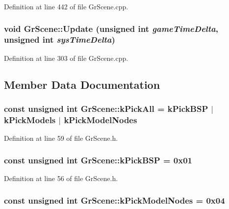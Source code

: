 Definition at line 442 of file GrScene.cpp.\hypertarget{class_gr_scene_c54d822c42d667aff5aea61a64553402}{
\subsubsection[{Update}]{\setlength{\rightskip}{0pt plus 5cm}void GrScene::Update (unsigned int {\em gameTimeDelta}, \/  unsigned int {\em sysTimeDelta})}}
\label{class_gr_scene_c54d822c42d667aff5aea61a64553402}




Definition at line 303 of file GrScene.cpp.

\subsection{Member Data Documentation}
\hypertarget{class_gr_scene_a8cf807b21fc873fd6158af7ca6da3e5}{
\subsubsection[{kPickAll}]{\setlength{\rightskip}{0pt plus 5cm}const unsigned int {\bf GrScene::kPickAll} = {\bf kPickBSP} $|$ {\bf kPickModels} $|$ {\bf kPickModelNodes}}}
\label{class_gr_scene_a8cf807b21fc873fd6158af7ca6da3e5}




Definition at line 59 of file GrScene.h.\hypertarget{class_gr_scene_a2d4949176b03e4de401133af3c7539c}{
\subsubsection[{kPickBSP}]{\setlength{\rightskip}{0pt plus 5cm}const unsigned int {\bf GrScene::kPickBSP} = 0x01}}
\label{class_gr_scene_a2d4949176b03e4de401133af3c7539c}




Definition at line 56 of file GrScene.h.\hypertarget{class_gr_scene_f34d527cd99bc6bb9029a87a57de4b96}{
\subsubsection[{kPickModelNodes}]{\setlength{\rightskip}{0pt plus 5cm}const unsigned int {\bf GrScene::kPickModelNodes} = 0x04}}
\label{class_gr_scene_f34d527cd99bc6bb9029a87a57de4b96}




